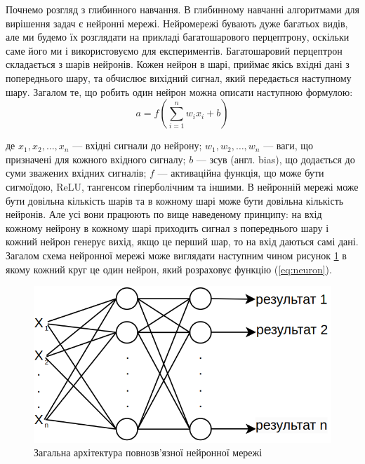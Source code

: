 Почнемо розгляд з глибинного навчання. В глибинному навчанні алгоритмами для вирішення задач є нейронні мережі. Нейромережі бувають дуже багатьох видів, але ми будемо їх розглядати на прикладі багатошарового перцептрону, оскільки саме його ми і використовуємо для експериментів. Багатошаровий перцептрон складається з шарів нейронів. Кожен нейрон в шарі, приймає якісь вхідні дані з попереднього шару, та обчислює вихідний сигнал, який передається наступному шару. Загалом те, що робить один нейрон можна описати наступною формулою:
\begin{equation}
\label{eq:neuron}
	a = f\left(\sum_{i=1}^n w_i x_i + b \right)
\end{equation}

де \(x_1, x_2, \ldots, x_n\) — вхідні сигнали до нейрону; \(w_1, w_2, \ldots, w_n\) — ваги, що призначені для кожного вхідного сигналу; \(b\) — зсув (англ. bias), що додається до суми зважених вхідних сигналів; \(f\) — активаційна функція, що може бути сигмоїдою, ReLU, тангенсом гіперболічним та іншими. В нейронній мережі може бути довільна кількість шарів та в кожному шарі може бути довільна кількість нейронів. Але усі вони працюють по вище наведеному принципу: на вхід кожному нейрону в кожному шарі приходить сигнал з попереднього шару і кожний нейрон генерує вихід, якщо це перший шар, то на вхід даються самі дані. Загалом схема нейронної мережі може виглядати наступним чином рисунок \ref{fig_nn_arch} в якому кожний круг це один нейрон, який розраховує функцію (\ref{eq:neuron}).

\begin{figure}[ht]
	\centering
	\includegraphics[scale=0.75]{Images/neural_network_architecture.png}
	\caption{Загальна архітектура повнозв'язної нейронної мережі}
	\label{fig_nn_arch}
\end{figure}

